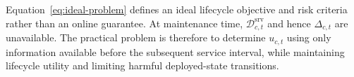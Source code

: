 Equation~\eqref{eq:ideal-problem} defines an ideal lifecycle objective and risk criteria rather than an online guarantee. At maintenance time, $\mathcal D^{\mathrm{srv}}_{c,t}$ and hence $\Delta_{c,t}$ are unavailable. The practical problem is therefore to determine $u_{c,t}$ using only information available before the subsequent service interval, while maintaining lifecycle utility and limiting harmful deployed-state transitions.
